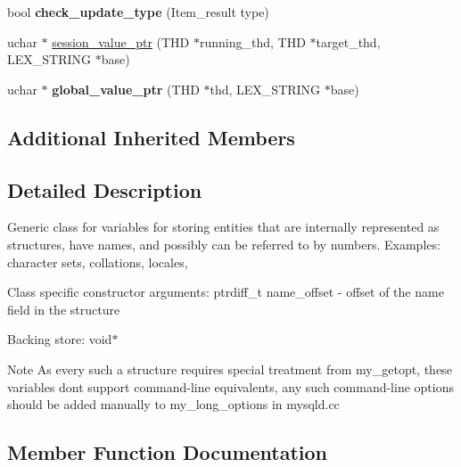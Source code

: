 \begin{DoxyCompactItemize}
\mbox{\label{classSys__var__struct_a8c676718df58d8e4112a7a1b37b18e13}} 
bool {\bfseries check\+\_\+update\+\_\+type} (Item\+\_\+result type)
\item 
uchar $\ast$ \mbox{\hyperlink{classSys__var__struct_a7b5ac3196a09a38b6439c25d63e30e8f}{session\+\_\+value\+\_\+ptr}} (T\+HD $\ast$running\+\_\+thd, T\+HD $\ast$target\+\_\+thd, L\+E\+X\+\_\+\+S\+T\+R\+I\+NG $\ast$base)
\item 
\mbox{\label{classSys__var__struct_a1494e8bf916c02f5d76470dcece31f8e}} 
uchar $\ast$ {\bfseries global\+\_\+value\+\_\+ptr} (T\+HD $\ast$thd, L\+E\+X\+\_\+\+S\+T\+R\+I\+NG $\ast$base)
\end{DoxyCompactItemize}
\subsection*{Additional Inherited Members}


\subsection{Detailed Description}
Generic class for variables for storing entities that are internally represented as structures, have names, and possibly can be referred to by numbers. Examples\+: character sets, collations, locales,

Class specific constructor arguments\+: ptrdiff\+\_\+t name\+\_\+offset -\/ offset of the \textquotesingle{}name\textquotesingle{} field in the structure

Backing store\+: void$\ast$

\begin{DoxyNote}{Note}
As every such a structure requires special treatment from my\+\_\+getopt, these variables don\textquotesingle{}t support command-\/line equivalents, any such command-\/line options should be added manually to my\+\_\+long\+\_\+options in mysqld.\+cc 
\end{DoxyNote}


\subsection{Member Function Documentation}
\mbox{\label{classSys__var__struct_a38f274d135a2d5f17fbec6237149a5fe}} 
